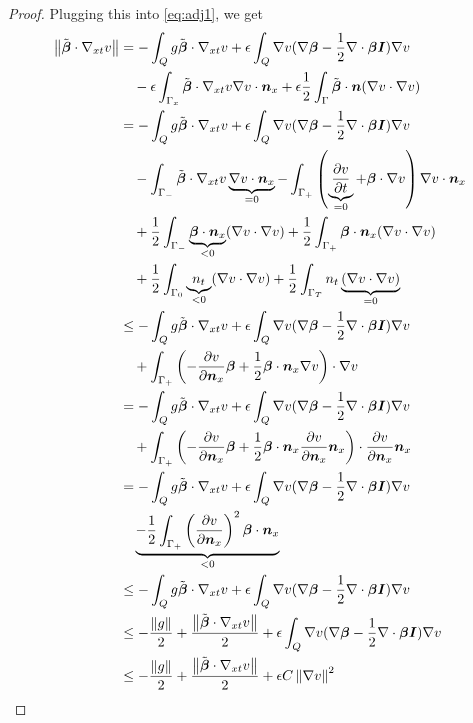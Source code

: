\documentclass{article}
\begin{document}
\begin{proof}
Plugging this into \eqref{eq:adj1}, we get
\begin{align*}
\norm{\tilde\bfbeta\cdot\Gradxt v}
&=-\int_Q g\tilde\bfbeta\cdot\Gradxt v
+\epsilon\int_Q\Grad v(\Grad\bfbeta-\frac{1}{2}\Div\bfbeta\bfI)\Grad v\\
&\quad-\epsilon\int_{\Gamma_x}\tilde\bfbeta\cdot\Gradxt v\Grad v\cdot\bfn_x
+\epsilon\frac{1}{2}\int_\Gamma\tilde\bfbeta\cdot\bfn(\Grad v\cdot\Grad v)\\
%
&=-\int_Q g\tilde\bfbeta\cdot\Gradxt v
+\epsilon\int_Q\Grad v(\Grad\bfbeta-\frac{1}{2}\Div\bfbeta\bfI)\Grad v\\
&\quad
-\int_{\Gamma_-}\tilde\bfbeta\cdot\Gradxt v\underbrace{\Grad v\cdot\bfn_x}_{=0}
-\int_{\Gamma_+}\LRp{\underbrace{\pd{v}{t}}_{=0}+\bfbeta\cdot\Grad v}\Grad v\cdot\bfn_x\\
&\quad
+\frac{1}{2}\int_{\Gamma_-}\underbrace{\bfbeta\cdot\bfn_x}_{<0}(\Grad v\cdot\Grad v)
+\frac{1}{2}\int_{\Gamma_+}\bfbeta\cdot\bfn_x(\Grad v\cdot\Grad v)\\
&\quad
+\frac{1}{2}\int_{\Gamma_0}\underbrace{n_t}_{<0}(\Grad v\cdot\Grad v)
+\frac{1}{2}\int_{\Gamma_T}n_t\underbrace{(\Grad v\cdot\Grad v)}_{=0}\\
%
&\leq-\int_Q g\tilde\bfbeta\cdot\Gradxt v
+\epsilon\int_Q\Grad v(\Grad\bfbeta-\frac{1}{2}\Div\bfbeta\bfI)\Grad v\\
&\quad
+\int_{\Gamma_+}\LRp{-\pd{v}{\bfn_x}\bfbeta
+\frac{1}{2}\bfbeta\cdot\bfn_x\Grad v}\cdot\Grad v\\
%
&=-\int_Q g\tilde\bfbeta\cdot\Gradxt v
+\epsilon\int_Q\Grad v(\Grad\bfbeta-\frac{1}{2}\Div\bfbeta\bfI)\Grad v\\
&\quad
+\int_{\Gamma_+}\LRp{-\pd{v}{\bfn_x}\bfbeta
+\frac{1}{2}\bfbeta\cdot\bfn_x\pd{v}{\bfn_x}\bfn_x}\cdot\pd{v}{\bfn_x}\bfn_x\\
%
&=-\int_Q g\tilde\bfbeta\cdot\Gradxt v
+\epsilon\int_Q\Grad v(\Grad\bfbeta-\frac{1}{2}\Div\bfbeta\bfI)\Grad v\\
&\quad
\underbrace{-\frac{1}{2}\int_{\Gamma_+}\LRp{\pd{v}{\bfn_x}}^2\bfbeta\cdot\bfn_x}_{<0}\\
%
&\leq-\int_Q g\tilde\bfbeta\cdot\Gradxt v
+\epsilon\int_Q\Grad v(\Grad\bfbeta-\frac{1}{2}\Div\bfbeta\bfI)\Grad v\\
%
&\leq-\frac{\norm{g}}{2}+\frac{\norm{\tilde\bfbeta\cdot\Gradxt v}}{2}
+\epsilon\int_Q\Grad v(\Grad\bfbeta-\frac{1}{2}\Div\bfbeta\bfI)\Grad v\\
%
&\leq-\frac{\norm{g}}{2}+\frac{\norm{\tilde\bfbeta\cdot\Gradxt v}}{2}
+\epsilon C\norm{\Grad v}^2
\end{align*}
\end{proof}
\end{document}
